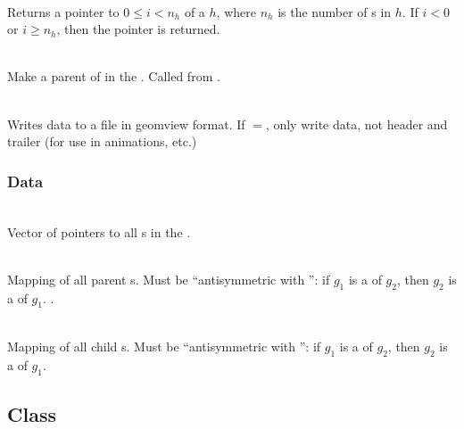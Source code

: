 \documentclass[11pt]{article}
\begin{document}
     \\ Returns a pointer
    to  $0 \le i < n_h$ of a  $h$, where
    $n_h$ is the number of s in $h$.  If $i <0 $ or $i \ge
    n_h$, then the  pointer is returned.

     \\
    Make   a parent of  in the .
    Called from .

     \\ Writes  data to a file in geomview format.
    If $=$, only write data, not header and
    trailer (for use in animations, etc.)

\subsubsection{ Data}


     \\
    Vector of pointers to all s in the .

     \\
    Mapping of all parent s.  Must be ``antisymmetric with 
    '': if $g_1$ is a  of $g_2$, then $g_2$ is
    a  of $g_1$.
.

     \\
    Mapping of all child s.    Must be ``antisymmetric with 
    '': if $g_1$ is a  of $g_2$, then $g_2$ is
    a  of $g_1$.



\subsection{ Class} \label{s:iterator}
\end{document}
